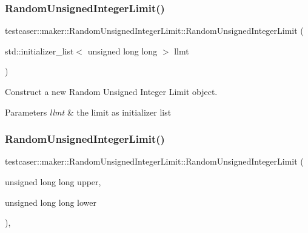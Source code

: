 \subsubsection{\texorpdfstring{Random\+Unsigned\+Integer\+Limit()}{RandomUnsignedIntegerLimit()}\hspace{0.1cm}{\footnotesize\ttfamily [1/2]}}
{\footnotesize\ttfamily testcaser\+::maker\+::\+Random\+Unsigned\+Integer\+Limit\+::\+Random\+Unsigned\+Integer\+Limit (\begin{DoxyParamCaption}\item[{std\+::initializer\+\_\+list$<$ unsigned long long $>$}]{llmt }\end{DoxyParamCaption})\hspace{0.3cm}{\ttfamily [inline]}}



Construct a new Random Unsigned Integer Limit object. 


\begin{DoxyParams}{Parameters}
{\em llmt} & the limit as initializer list \\
\hline
\end{DoxyParams}
\mbox{\label{classtestcaser_1_1maker_1_1RandomUnsignedIntegerLimit_a4299cc026c1ed26b595c248c6e243f8c}} 
\subsubsection{\texorpdfstring{Random\+Unsigned\+Integer\+Limit()}{RandomUnsignedIntegerLimit()}\hspace{0.1cm}{\footnotesize\ttfamily [2/2]}}
{\footnotesize\ttfamily testcaser\+::maker\+::\+Random\+Unsigned\+Integer\+Limit\+::\+Random\+Unsigned\+Integer\+Limit (\begin{DoxyParamCaption}\item[{unsigned long long}]{upper,  }\item[{unsigned long long}]{lower }\end{DoxyParamCaption})\hspace{0.3cm}{\ttfamily [inline]}, {\ttfamily [explicit]}}



